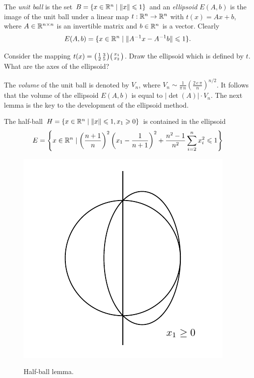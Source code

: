 The \emph{unit ball} is the set $B = \{ x \in \mathbb{R}^n \mid \|x\|\leqslant1\}$ and an
\emph{ellipsoid} $E(A,b)$ is the image of the unit ball under a linear map
$t:\mathbb{R}^n\to\mathbb{R}^n$ with $t(x) = Ax +b$, where $A \in \mathbb{R}^{n\times n}$ is an invertible
matrix and $b \in \mathbb{R}^n$ is a vector.  Clearly 
\begin{equation}
  \label{el:eq:13}
  E(A,b) =  \{ x \in \mathbb{R}^n \mid \|  A^{-1} x - A^{-1} b \| \leqslant1\}. 
\end{equation}
%



\begin{exercise}
  \label{el:ex:8}
  Consider the mapping $t(x) = \big(\begin{smallmatrix} 1 & 3 \\ 2 & 5 \end{smallmatrix}\big)
  \big(\begin{smallmatrix} x_1\\x_2 \end{smallmatrix}\big)$. Draw the ellipsoid which is defined by $t$. What
  are the axes of the ellipsoid? 
\end{exercise}


The \emph{volume} of the unit ball is denoted by $V_n$, where $V_n \sim
\frac{1}{\pi\,n} \left( \frac{2\,e\,\pi}{n}\right)^{n/2}$. It follows that
the volume of the ellipsoid $E(A,b)$ is equal to $|\det(A)| \cdot V_n$.
The next lemma is the key to the development of the ellipsoid method. 

\begin{lemma}
  \label{el:lem:12}
  The half-ball $H=\{x \in \mathbb{R}^n \mid \|x\|\leqslant1, x_1\geqslant0\}$ is contained in the
  ellipsoid 
  \begin{equation}
    \label{el:eq:13}
    E = \left\{ x \in \mathbb{R}^n \mid \left(\frac{n+1}{n}\right)^2  \left( x_1 -
      \frac{1}{n+1}\right)^2 + \frac{n^2-1}{n^2} \sum_{i=2}^n x_i^2 \leqslant1 \right\}
  \end{equation}
\end{lemma}



\begin{figure}[htbp]
  \centering 
  {
    \includegraphics{figures/ellipsoid1.pdf}
  }
  \caption{Half-ball lemma.}
  \label{el:fig:half-ball}
\end{figure}



